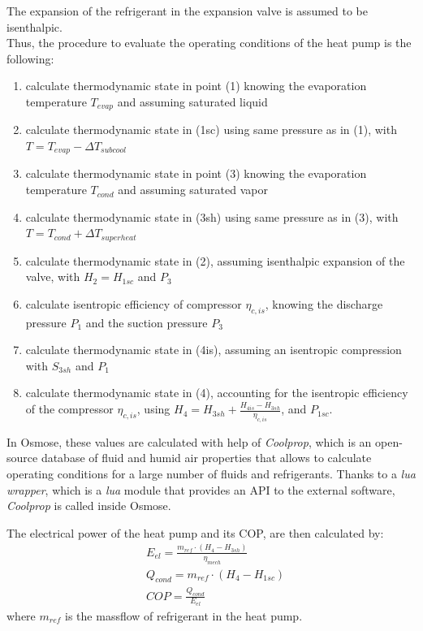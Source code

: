 \documentclass{article}
\begin{document}
The expansion of the refrigerant in the expansion valve is assumed to be isenthalpic.\\ 

Thus, the procedure to evaluate the operating conditions of the heat pump is the following:
\begin{enumerate}
	\item calculate thermodynamic state in point (1) knowing the evaporation temperature $T_{evap}$ and assuming saturated liquid
	\item calculate thermodynamic state in (1sc) using same pressure as in (1), with $T = T_{evap} - \Delta T_{subcool}$
	\item calculate thermodynamic state in point (3) knowing the evaporation temperature $T_{cond}$ and assuming saturated vapor
	\item calculate thermodynamic state in (3sh) using same pressure as in (3), with $T = T_{cond} + \Delta T_{superheat}$
	\item calculate thermodynamic state in (2), assuming isenthalpic expansion of the valve, with $H_{2} = H_{1sc}$ and $P_{3}$
	\item calculate isentropic efficiency of compressor $\eta_{c,is}$, knowing the discharge pressure $P_{1}$ and the suction pressure $P_{3}$
	\item calculate thermodynamic state in (4is), assuming an isentropic compression with $S_{3sh}$ and $P_{1}$
	\item calculate thermodynamic state in (4), accounting for the isentropic efficiency of the compressor $\eta_{c,is}$, using $H_{4} = H_{3sh} + \frac{H_{4is} - H_{3sh}}{\eta_{c,is}}$, and $P_{1sc}$.
\end{enumerate}

In Osmose, these values are calculated with help of \textit{Coolprop}, which is an open-source database of fluid and humid air properties that allows to calculate operating conditions for a large number of fluids and refrigerants. Thanks to a \textit{lua wrapper}, which is a \textit{lua} module that provides an API to the external software, \textit{Coolprop} is called inside Osmose.

The electrical power of the heat pump and its COP, are then calculated by:
\begin{align}
	& E_{el} = \frac{m_{ref} \cdot (H_{4}-H_{3sh})}{\eta_{mech}}\\
	& Q_{cond} = m_{ref} \cdot (H_{4}-H_{1sc})\\
	& COP = \frac{Q_{cond}}{E_{el}}
\end{align}
where $m_{ref}$ is the massflow of refrigerant in the heat pump.
\end{document}
